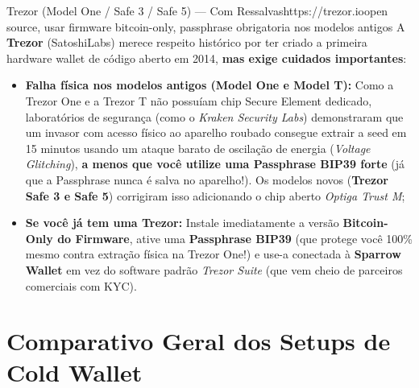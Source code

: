 \documentclass{pousadaguide}
\begin{document}
\begin{ferramenta}[logo=trezor]{Trezor (Model One / Safe 3 / Safe 5) — Com Ressalvas}{https://trezor.io}{open source, usar firmware bitcoin-only, passphrase obrigatoria nos modelos antigos}
A \textbf{Trezor} (SatoshiLabs) merece respeito histórico por ter criado a primeira hardware wallet de código aberto em 2014, \textbf{mas exige cuidados importantes}:
\begin{itemize}
  \item \textbf{Falha física nos modelos antigos (Model One e Model T):} Como a Trezor One e a Trezor T não possuíam chip Secure Element dedicado, laboratórios de segurança (como o \emph{Kraken Security Labs}) demonstraram que um invasor com acesso físico ao aparelho roubado consegue extrair a seed em 15 minutos usando um ataque barato de oscilação de energia (\emph{Voltage Glitching}), \textbf{a menos que você utilize uma Passphrase BIP39 forte} (já que a Passphrase nunca é salva no aparelho!). Os modelos novos (\textbf{Trezor Safe 3 e Safe 5}) corrigiram isso adicionando o chip aberto \emph{Optiga Trust M};
  \item \textbf{Se você já tem uma Trezor:} Instale imediatamente a versão \textbf{Bitcoin-Only do Firmware}, ative uma \textbf{Passphrase BIP39} (que protege você 100\% mesmo contra extração física na Trezor One!) e use-a conectada à \textbf{Sparrow Wallet} em vez do software padrão \emph{Trezor Suite} (que vem cheio de parceiros comerciais com KYC).
\end{itemize}
\end{ferramenta}

\clearpage
\section{Comparativo Geral dos Setups de Cold Wallet}
\end{document}
